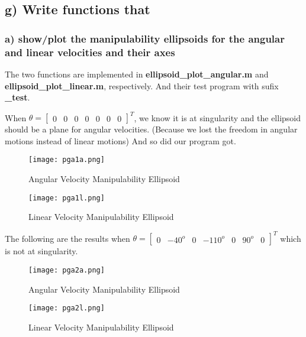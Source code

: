 \documentclass[english,10pt,a4paper]{article}
\begin{document}
    \subsection*{g) Write functions that }
    \subsubsection*{a) show/plot the manipulability ellipsoids for the angular and linear velocities and their axes}
    The two functions are implemented in \textbf{ellipsoid\_plot\_angular.m} and \textbf{ellipsoid\_plot\_linear.m}, respectively. And their test program with sufix \textbf{\_test}.
    
    When $\theta = \begin{bmatrix}
        0 & 0 & 0 & 0 & 0 & 0 & 0
    \end{bmatrix}^T$, we know it is at singularity and the ellipsoid should be a plane for angular velocities. (Because we lost the freedom in angular motions instead of linear motions) And so did our program got.
    \begin{figure}[H]
        \centering
        \begin{minipage}{0.45\textwidth}
            \centering
            \texttt{[image: pga1a.png]} %
            \caption{Angular Velocity Manipulability Ellipsoid}
            \label{fig:pga1a}
        \end{minipage}
        \hfill
        \begin{minipage}{0.45\textwidth}
        \centering
            \texttt{[image: pga1l.png]} %
            \caption{Linear Velocity Manipulability Ellipsoid}
            \label{fig:pga1l}
        \end{minipage}
    \end{figure}

    The following are the results when $\theta = \begin{bmatrix}
        0 & -40^o & 0 & -110^o & 0 & 90^o & 0
    \end{bmatrix}^T$ which is not at singularity.
    \begin{figure}[H]
        \centering
        \begin{minipage}{0.45\textwidth}
            \centering
            \texttt{[image: pga2a.png]} %
            \caption{Angular Velocity Manipulability Ellipsoid}
            \label{fig:pga2a}
        \end{minipage}
        \hfill
        \begin{minipage}{0.45\textwidth}
        \centering
            \texttt{[image: pga2l.png]} %
            \caption{Linear Velocity Manipulability Ellipsoid}
            \label{fig:pga2l}
        \end{minipage}
    \end{figure}
\end{document}
